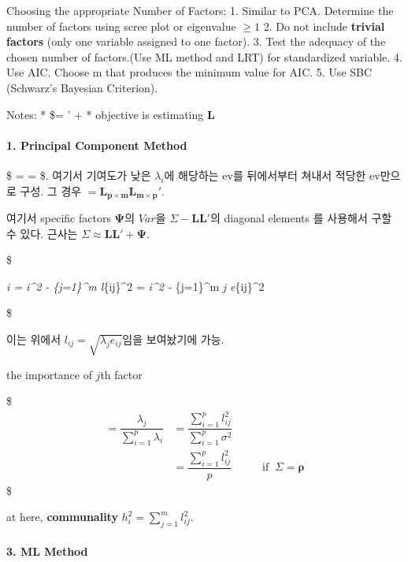 \documentclass[
]{book}
\begin{document}
{{Choosing the appropriate Number of Factors:
1. Similar to PCA. Determine the number of factors using scree plot or eigenvalue \(\ge 1\)
2. Do not include \textbf{trivial factors} (only one variable assigned to one factor).
3. Test the adequacy of the chosen number of factors.(Use ML method and LRT) for standardized variable.
4. Use AIC. Choose m that produces the minimum value for AIC.
5. Use SBC (Schwarz's Bayesian Criterion).

Notes:
* \$\Sigma = ' + \pmb \Psi
* objective is estimating \(\pmb L\)

\hypertarget{principal-component-method}{%
\paragraph{1. Principal Component Method}\label{principal-component-method}}

\$ \Sigma =  = \$. 여기서 기여도가 낮은 \(\lambda_i\)에 해당하는 ev를 뒤에서부터 쳐내서 적당한 ev만으로 구성. 그 경우 \(=\pmb {L_{p \times m} L_{m \times p}'}\).

여기서 specific factors \(\pmb \Psi\)의 \(Var\)을 \(\Sigma - \pmb {LL'}\)의 diagonal elements 를 사용해서 구할 수 있다. 근사는 \(\Sigma \approx \pmb {LL' + \Psi}\).

\$

\Psi\emph{i = \sigma\emph{i\^{}2 - \sum}\{j=1\}\^{}m l}\{ij\}\^{}2 = \sigma\emph{i\^{}2 - \sum}\{j=1\}\^{}m \lambda\emph{j e}\{ij\}\^{}2

\$

이는 위에서 \(l_{ij} = \sqrt {\lambda_j e_{ij}}\)임을 보여놨기에 가능.

the importance of \(j\)th factor

\$
\begin{align*}
= \dfrac {\lambda_j}{\sum_{i=1}^p \lambda_i} &= \dfrac {\sum_{i=1}^p l_{ij}^2} {\sum_{i=1}^p \sigma^2} \\

&= \dfrac {\sum_{i=1}^p l_{ij}^2} {p} \; \; \; \; \; \; \; \; \; \; \text{if} \; \; \Sigma=\pmb \rho

\end{align*}
\$

at here, \textbf{communality} \(h_i^2 = \sum_{j=1}^m l_{ij}^2\).

\hypertarget{ml-method}{%
\paragraph{3. ML Method}\label{ml-method}}

}}
\end{document}
